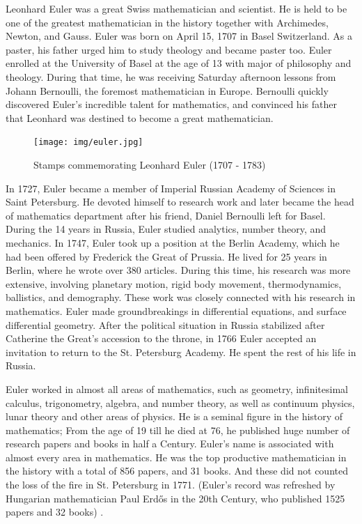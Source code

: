 \documentclass[b5paper]{article}
\begin{document}
\vspace{5mm}


Leonhard Euler was a great Swiss mathematician and scientist. He is held to be one of the greatest mathematician in the history together with Archimedes, Newton, and Gauss. Euler was born on April 15, 1707 in Basel Switzerland. As a paster, his father urged him to study theology and became paster too. Euler enrolled at the University of Basel at the age of 13 with major of philosophy and theology. During that time, he was receiving Saturday afternoon lessons from Johann Bernoulli, the foremost mathematician in Europe. Bernoulli quickly discovered Euler's incredible talent for mathematics, and convinced his father that Leonhard was destined to become a great mathematician.

\begin{figure}[htbp]
 \centering
 \texttt{[image: img/euler.jpg]}
 \captionsetup{labelformat=empty}
 \caption{Stamps commemorating Leonhard Euler (1707 - 1783)}
 \label{fig:Leonhard-Euler}
\end{figure}

In 1727, Euler became a member of Imperial Russian Academy of Sciences in Saint Petersburg. He devoted himself to research work and later became the head of mathematics department after his friend, Daniel Bernoulli left for Basel. During the 14 years in Russia, Euler studied analytics, number theory, and mechanics. In 1747, Euler took up a position at the Berlin Academy, which he had been offered by Frederick the Great of Prussia. He lived for 25 years in Berlin, where he wrote over 380 articles. During this time, his research was more extensive, involving planetary motion, rigid body movement, thermodynamics, ballistics, and demography. These work was closely connected with his research in mathematics. Euler made groundbreakings in differential equations, and surface differential geometry. After the political situation in Russia stabilized after Catherine the Great's accession to the throne, in 1766 Euler accepted an invitation to return to the St. Petersburg Academy. He spent the rest of his life in Russia.

Euler worked in almost all areas of mathematics, such as geometry, infinitesimal calculus, trigonometry, algebra, and number theory, as well as continuum physics, lunar theory and other areas of physics. He is a seminal figure in the history of mathematics; From the age of 19 till he died at 76, he published huge number of research papers and books in half a Century. Euler's name is associated with almost every area in mathematics. He was the top productive mathematician in the history with a total of 856 papers, and 31 books. And these did not counted the loss of the fire in St. Petersburg in 1771. (Euler's record was refreshed by Hungarian mathematician Paul Erdős in the 20th Century, who published 1525 papers and 32 books) \cite{Wiki-Euler}.
\end{document}
